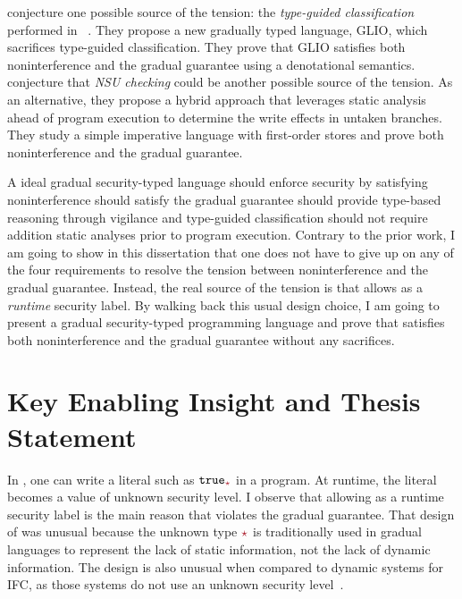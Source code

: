 \textcite{Amorim:2020aa} conjecture one possible source of the tension: the
\textit{type-guided classification} performed in
\GSLRef~\parencite{Toro:2018aa}. They propose a new gradually typed language,
GLIO, which sacrifices type-guided classification. They prove that GLIO
satisfies both noninterference and the gradual guarantee using a denotational
semantics.
%
\textcite{bichhawat2021gradual} conjecture that \textit{NSU checking} could be
another possible source of the tension. As an alternative, they propose a hybrid
approach that leverages static analysis ahead of program execution to determine
the write effects in untaken branches. They study a simple imperative language
with first-order stores and prove both noninterference and the gradual
guarantee.

A ideal gradual security-typed language  should enforce security by
satisfying noninterference  should satisfy the gradual guarantee
 should provide type-based reasoning through vigilance and
type-guided classification  should not require addition static
analyses prior to program execution. Contrary to the prior work, I am going to
show in this dissertation that one does not have to give up on any of the four
requirements to resolve the tension between noninterference and the gradual
guarantee. Instead, the real source of the tension is that \GSLRef allows \unk
as a \textit{runtime} security label. By walking back this usual design choice,
I am going to present a gradual security-typed programming language \Surface and
prove that \Surface satisfies both noninterference and the gradual guarantee
without any sacrifices.

\section{Key Enabling Insight and Thesis Statement}

In \GSLRef{}, one can write a literal such as $\true_{\unk}$ in a program. At
runtime, the literal becomes a value of unknown security level. I observe that
allowing \unk as a runtime security label is the main reason that \GSLRef
violates the gradual guarantee. That design of \GSLRef was unusual because the
unknown type $\unk$ is traditionally used in gradual languages to represent the
lack of static information, not the lack of dynamic information. The design is
also unusual when compared to dynamic systems for IFC, as those systems do not
use an unknown security
level~\parencite{Askarov:2009vq,austin2009efficient,Devriese:2010up,stefan2011flexible,Austin:2017uh}.

